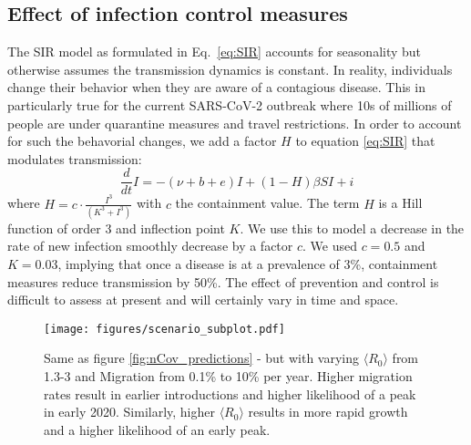 \documentclass[rmp, reprint, superscriptaddress, floatfix,amsmath]{revtex4-1}
\begin{document}
\subsection*{Effect of infection control measures}
The SIR model as formulated in Eq.~\ref{eq:SIR} accounts for seasonality but otherwise assumes the transmission dynamics is constant. 
In reality, individuals change their behavior when they are aware of a contagious disease.
This in particularly true for the current SARS-CoV-2 outbreak where 10s of millions of people are under quarantine measures and travel restrictions.
In order to account for such the behavorial changes, we add a factor $H$ to equation \ref{eq:SIR} that modulates transmission:
\begin{equation}
\frac{d}{dt} I =  -(\nu+b+e) I + (1-H)\beta S I + i
\end{equation}
where $H = c\cdot\frac{I^3}{(K^3+I^3)}$ with $c$ the containment value. The term $H$ is a Hill function of order 3 and inflection point $K$. 
We use this to model a decrease in the rate of new infection smoothly decrease by a factor $c$. 
We used $c=0.5$ and $K=0.03$, implying that once a disease is at a prevalence of 3\%, containment measures reduce transmission by 50\%.
The effect of prevention and control is difficult to assess at present and will certainly vary in time and space. 


\begin{figure*}[h]
	\centering
	\texttt{[image: figures/scenario\_subplot.pdf]}
	\caption{Same as figure \ref{fig:nCov_predictions} - but with varying $\langle R_0\rangle$ from 1.3-3 and Migration from 0.1\% to 10\% per year. Higher migration rates result in earlier introductions and higher likelihood of a peak in early 2020. Similarly, higher $\langle R_0\rangle$ results in more rapid growth and a higher likelihood of an early peak.}
	\label{fig:scenarios_supp}
\end{figure*}
\end{document}
